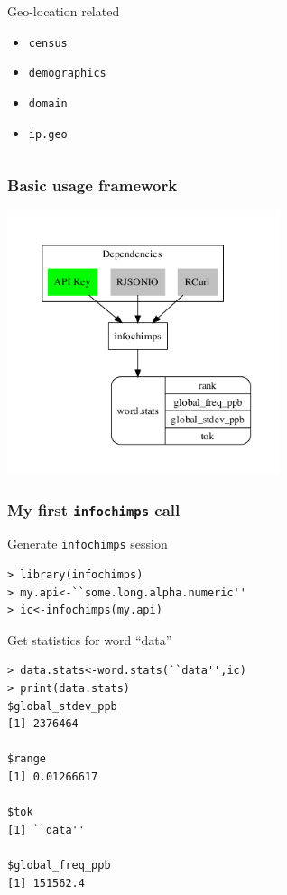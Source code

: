 \documentclass[xcolor=dvipsnames, 9pt,handout]{beamer}
\begin{document}
\begin{frame}[fragile]
{\begin{columns}
                \begin{block}{Geo-location related}
                    \begin{itemize}
                        \item \texttt{census}
                        \item \texttt{demographics}
                        \item \texttt{domain}
                        \item \texttt{ip.geo}
                    \end{itemize}
                \end{block}
                \vspace{8.5mm}
        \end{columns}}
\end{frame}

\begin{frame}[fragile]
    \frametitle{Basic usage framework}
    \begin{center}
        \includegraphics[width=8cm]{images/struct.pdf}
    \end{center}
\end{frame}

\begin{frame}[fragile]
    \frametitle{My first \texttt{infochimps} call}
    \alert<1>{Generate \texttt{infochimps} session}
    \begin{lstlisting}
> library(infochimps)
> my.api<-``some.long.alpha.numeric''
> ic<-infochimps(my.api)
    \end{lstlisting}
    \alert<2>{Get statistics for word ``data''}
    \begin{lstlisting}
> data.stats<-word.stats(``data'',ic)
> print(data.stats)
$global_stdev_ppb
[1] 2376464

$range
[1] 0.01266617

$tok
[1] ``data''

$global_freq_ppb
[1] 151562.4
    \end{lstlisting}
\end{frame}
\end{document}
